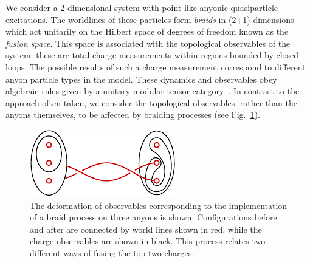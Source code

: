 \documentclass[aps, prl, letterpaper, twocolumn, superscriptaddress, notitlepage, 10pt]{revtex4-1}
\newcommand{\Fref}[1]{Fig.~\ref{#1}}
\begin{document}
We consider a 
2-dimensional system with
point-like anyonic quasiparticle excitations.%
The worldlines of these particles form \emph{braids}
in (2+1)-dimensions
which act unitarily on the Hilbert space of degrees of freedom known as the \emph{fusion space}.
This space is associated with
the topological observables of the system: these
are total charge measurements within regions bounded by 
closed loops.%
The possible results of such a charge measurement correspond to different anyon particle types in the model.
These dynamics and observables obey algebraic rules
given by a unitary modular tensor category~\cite{Wang2010b}. In contrast to the approach often taken, we consider the topological observables, rather than the anyons themselves, to be affected by braiding processes (see \Fref{f:braidloop}).

\begin{figure}[t!]
\begin{center}
    \includegraphics[]{pic-braid-loop.pdf}
\caption{
The deformation of observables corresponding to the implementation of a braid process on three anyons is shown. Configurations before and after are connected by world lines shown in red, while the charge observables are shown in black.
This process relates two different ways of fusing the top two charges.
\label{f:braidloop}
}
\end{center}
\vspace{-10pt}
\end{figure}
\end{document}
